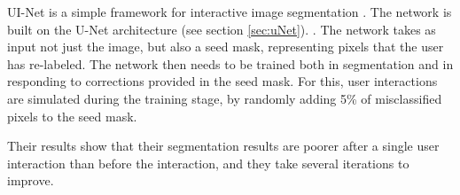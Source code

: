 UI-Net is a simple framework for interactive image segmentation \cite{UI-Net}. The network is built on the U-Net architecture \cite{uNet} (see section \ref{sec:uNet}). \cite{fcn}. The network takes as input not just the image, but also a seed mask, representing pixels that the user has re-labeled. The network then needs to be trained both in segmentation and in responding to corrections provided in the seed mask. For this, user interactions are simulated during the training stage, by randomly adding 5\% of misclassified pixels to the seed mask.

Their results show that their segmentation results are poorer after a single user interaction than before the interaction, and they take several iterations to improve. 